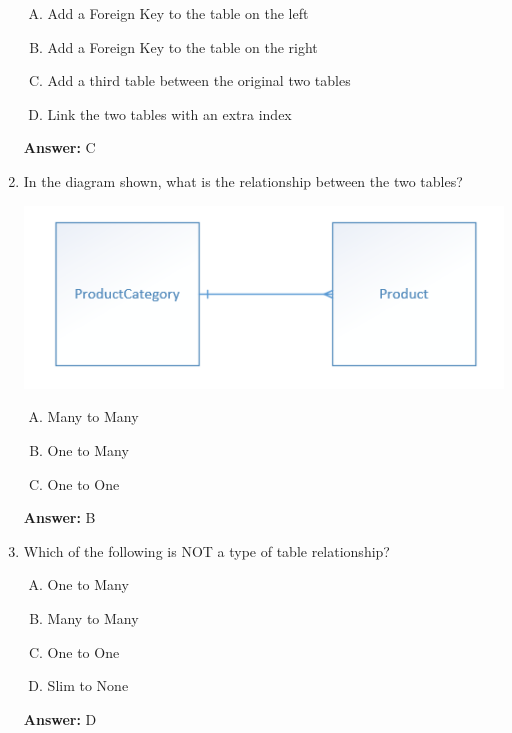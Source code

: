 \documentclass[12pt]{article}
\begin{document}
\begin{enumerate}[1.]
    \bigskip

    \begin{enumerate}[A.]
        \item Add a Foreign Key to the table on the left
        \item Add a Foreign Key to the table on the right
        \item Add a third table between the original two tables
        \item Link the two tables with an extra index
    \end{enumerate}

    \bigskip

    \textbf{Answer:} C

    \item

    In the diagram shown, what is the relationship between the two tables?

    \bigskip

    \begin{center}
    \includegraphics[width=0.4\linewidth]{images/part_3_notes_8.png}
    \end{center}

    \begin{enumerate}[A.]
        \item Many to Many
        \item One to Many
        \item One to One
    \end{enumerate}

    \bigskip

    \textbf{Answer:} B

    \item

    Which of the following is NOT a type of table relationship?

    \bigskip

    \begin{enumerate}[A.]
        \item One to Many
        \item Many to Many
        \item One to One
        \item Slim to None
    \end{enumerate}

    \bigskip

    \textbf{Answer:} D

\end{enumerate}
\end{document}
